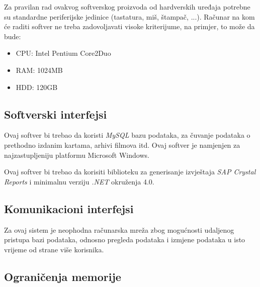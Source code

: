 Za pravilan rad ovakvog softverskog proizvoda od hardverskih uređaja potrebne su standardne periferijske jedinice (tastatura, miš, štampač, ...). Računar na kom će raditi softver ne treba zadovoljavati visoke kriterijume, na primjer, to može da bude:
\begin{itemize}
  \item CPU: Intel Pentium Core2Duo 
  \item RAM: 1024MB
  \item HDD: 120GB
\end{itemize}
%
%
%
%
\subsection{Softverski interfejsi}

Ovaj softver bi trebao da koristi \textit{MySQL} bazu podataka, za čuvanje podataka o prethodno izdanim kartama, arhivi filmova itd. Ovaj softver je namjenjen za najzastupljeniju platformu Microsoft Windows.

Ovaj softver bi trebao da korisiti biblioteku za generisanje izvještaja \textit{SAP Crystal Reports} i minimalnu verziju \textit{.NET} okruženja 4.0.


\subsection{Komunikacioni interfejsi} 

Za ovaj sistem je neophodna računarska mreža zbog mogućnosti udaljenog pristupa bazi podataka, odnosno pregleda podataka i izmjene podataka u isto vrijeme od strane više korisnika.
%
%

\subsection{Ograničenja memorije}

